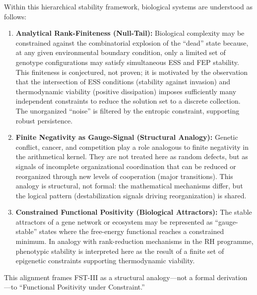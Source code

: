 \documentclass[12pt,a4paper]{article}
\theoremstyle{remark}
\begin{document}
Within this hierarchical stability framework, biological systems are understood as follows:
\begin{enumerate}[label=\alph*)]
    \item \textbf{Analytical Rank-Finiteness (Null-Tail):} Biological complexity may be constrained against the combinatorial explosion of the ``dead'' state because, at any given environmental boundary condition, only a limited set of genotype configurations may satisfy simultaneous ESS and FEP stability. This finiteness is conjectured, not proven; it is motivated by the observation that the intersection of ESS conditions (stability against invasion) and thermodynamic viability (positive dissipation) imposes sufficiently many independent constraints to reduce the solution set to a discrete collection. The unorganized ``noise'' is filtered by the entropic constraint, supporting robust persistence.
    \item \textbf{Finite Negativity as Gauge-Signal (Structural Analogy):} Genetic conflict, cancer, and competition play a role analogous to finite negativity in the arithmetical kernel. They are not treated here as random defects, but as signals of incomplete organizational coordination that can be reduced or reorganized through new levels of cooperation (major transitions). This analogy is structural, not formal: the mathematical mechanisms differ, but the logical pattern (destabilization signals driving reorganization) is shared.
    \item \textbf{Constrained Functional Positivity (Biological Attractors):} The stable attractors of a gene network or ecosystem may be represented as ``gauge-stable'' states where the free-energy functional reaches a constrained minimum. In analogy with rank-reduction mechanisms in the RH programme, phenotypic stability is interpreted here as the result of a finite set of epigenetic constraints supporting thermodynamic viability.
\end{enumerate}

This alignment frames FST-III as a structural analogy---not a formal derivation---to ``Functional Positivity under Constraint.''
\end{document}
